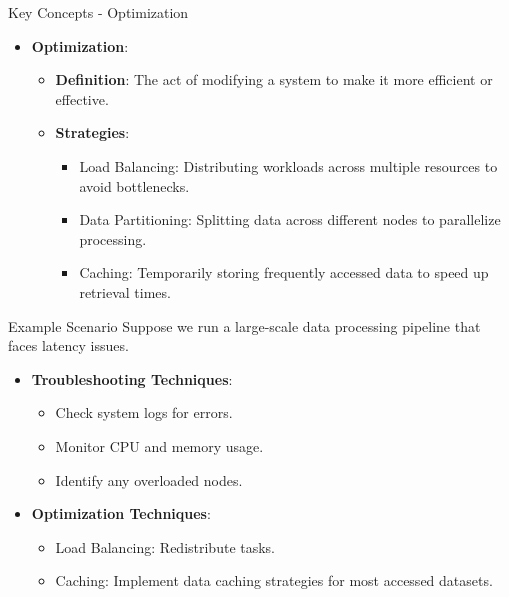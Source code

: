 \documentclass[aspectratio=169]{beamer}
\begin{document}
\begin{frame}{Key Concepts - Optimization}
    \begin{itemize}
        \item \textbf{Optimization}:
        \begin{itemize}
            \item \textbf{Definition}: The act of modifying a system to make it more efficient or effective.
            \item \textbf{Strategies}:
            \begin{itemize}
                \item Load Balancing: Distributing workloads across multiple resources to avoid bottlenecks.
                \item Data Partitioning: Splitting data across different nodes to parallelize processing.
                \item Caching: Temporarily storing frequently accessed data to speed up retrieval times.
            \end{itemize}
        \end{itemize}
    \end{itemize}
\end{frame}

\begin{frame}{Example Scenario}
    Suppose we run a large-scale data processing pipeline that faces latency issues. 
    \begin{itemize}
        \item \textbf{Troubleshooting Techniques}:
        \begin{itemize}
            \item Check system logs for errors.
            \item Monitor CPU and memory usage.
            \item Identify any overloaded nodes.
        \end{itemize}
        \item \textbf{Optimization Techniques}:
        \begin{itemize}
            \item Load Balancing: Redistribute tasks.
            \item Caching: Implement data caching strategies for most accessed datasets.
        \end{itemize}
    \end{itemize}
\end{frame}
\end{document}
